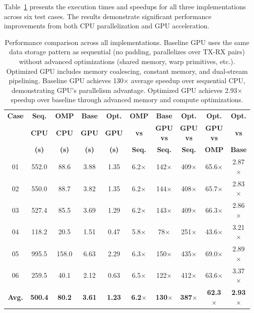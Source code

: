 \documentclass{article}
\begin{document}
Table~\ref{tab:performance} presents the execution times and speedups for all three implementations across six test cases. The results demonstrate significant performance improvements from both CPU parallelization and GPU acceleration.

\begin{table}[H]
\centering
\footnotesize
\begin{tabular}{cccccccccc}
\toprule
\textbf{Case} & \textbf{Seq.} & \textbf{OMP} & \textbf{Base} & \textbf{Opt.} & \textbf{OMP} & \textbf{Base} & \textbf{Opt.} & \textbf{Opt.} & \textbf{Opt.} \\
 & \textbf{CPU} & \textbf{CPU} & \textbf{GPU} & \textbf{GPU} & \textbf{vs} & \textbf{GPU vs} & \textbf{GPU vs} & \textbf{GPU vs} & \textbf{vs} \\
 & \textbf{(s)} & \textbf{(s)} & \textbf{(s)} & \textbf{(s)} & \textbf{Seq.} & \textbf{Seq.} & \textbf{Seq.} & \textbf{OMP} & \textbf{Base} \\
\midrule
01 & 552.0 & 88.6 & 3.88 & 1.35 & 6.2$\times$ & 142$\times$ & 409$\times$ & 65.6$\times$ & 2.87$\times$ \\
02 & 550.0 & 88.7 & 3.82 & 1.35 & 6.2$\times$ & 144$\times$ & 408$\times$ & 65.7$\times$ & 2.83$\times$ \\
03 & 527.4 & 85.5 & 3.69 & 1.29 & 6.2$\times$ & 143$\times$ & 409$\times$ & 66.3$\times$ & 2.86$\times$ \\
04 & 118.2 & 20.5 & 1.51 & 0.47 & 5.8$\times$ & 78$\times$ & 251$\times$ & 43.6$\times$ & 3.21$\times$ \\
05 & 995.5 & 158.0 & 6.63 & 2.29 & 6.3$\times$ & 150$\times$ & 435$\times$ & 69.0$\times$ & 2.89$\times$ \\
06 & 259.5 & 40.1 & 2.12 & 0.63 & 6.5$\times$ & 122$\times$ & 412$\times$ & 63.6$\times$ & 3.37$\times$ \\
\midrule
\textbf{Avg.} & \textbf{500.4} & \textbf{80.2} & \textbf{3.61} & \textbf{1.23} & \textbf{6.2$\times$} & \textbf{130$\times$} & \textbf{387$\times$} & \textbf{62.3$\times$} & \textbf{2.93$\times$} \\
\bottomrule
\end{tabular}
\caption{Performance comparison across all implementations. Baseline GPU uses the same data storage pattern as sequential (no padding, parallelizes over TX-RX pairs) without advanced optimizations (shared memory, warp primitives, etc.). Optimized GPU includes memory coalescing, constant memory, and dual-stream pipelining. Baseline GPU achieves 130$\times$ average speedup over sequential CPU, demonstrating GPU's parallelism advantage. Optimized GPU achieves 2.93$\times$ speedup over baseline through advanced memory and compute optimizations.}
\label{tab:performance}
\end{table}
\end{document}
